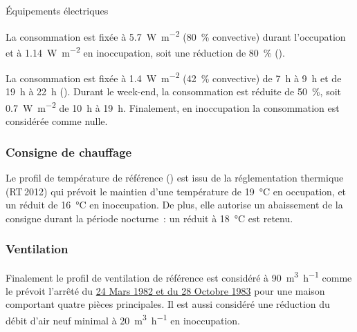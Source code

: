 \begin{blockdescription}{Équipements électriques}
    \item[Équipements électriques~:] La consommation est fixée à \SI{5.7}{\watt\per m^{2}} (\SI{80}{\percent}
                                      convective) durant l’occupation et à \SI{1.14}{\watt\per m^{2}} en inoccupation, soit une
                                      réduction de \SI{80}{\percent} ().
    \item[Éclairage~:] La consommation est fixée à \SI{1.4}{\watt\per m^{2}} (\SI{42}{\percent} convective) de
                       \SI{7}{\hour} à \SI{9}{\hour} et de \SI{19}{\hour} à \SI{22}{\hour}
                       (). Durant le week-end, la consommation est réduite de
                       \SI{50}{\percent}, soit \SI{0.7}{\watt\per m^{2}} de \SI{10}{\hour} à \SI{19}{\hour}.
                       Finalement, en inoccupation la consommation est considérée comme nulle.
\end{blockdescription}


\subsubsection{Consigne de chauffage} %
\label{ssub:consigne_de_chauffage}
Le profil de température de référence () est issu de la
réglementation thermique (RT\,2012) qui prévoit le maintien d’une température de
\SI{19}{\celsius} en occupation, et un réduit de \SI{16}{\celsius} en inoccupation. De plus,
elle autorise un abaissement de la consigne durant la période nocturne~: un réduit à \SI{18}{\celsius} est
retenu.

\subsubsection{Ventilation} %
\label{ssub:ventilation_ref}
Finalement le profil de ventilation de référence est considéré à \SI[per-mode=symbol]{90}{\meter\cubed\per\hour}
comme le prévoit l’arrêté du \href{https://www.legifrance.gouv.fr/affichTexte.do?cidTexte=JORFTEXT000000862344}{24 Mars
1982 et du 28 Octobre 1983} pour une maison comportant quatre pièces principales. Il est aussi
considéré une réduction du débit d’air neuf minimal à \SI[per-mode=symbol]{20}{\meter\cubed\per\hour}
en inoccupation.

